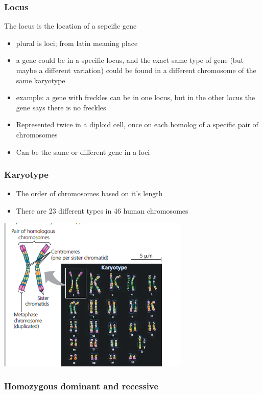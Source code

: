 \documentclass{article}
\begin{document}
\subsubsection*{Locus}
The locus is the location of a sepcific gene
\begin{itemize}
    \item plural is loci; from latin meaning place
    \item a gene could be in a specific locus, and the exact same type of gene (but maybe a different variation) could be found in a different chromosome of the same karyotype
    \item example: a gene with freckles can be in one locus, but in the other locus the gene says there is no freckles
    \item Represented twice in a diploid cell, once on each homolog of a specific pair of chromosomes
    \item Can be the same or different gene in a loci
\end{itemize}

\subsubsection*{Karyotype}
\begin{itemize}
    \item The order of chromosomes based on it's length
    \item There are 23 different types in 46 human chromosomes
\end{itemize}
\includegraphics*[scale=1.8]{karyotype.png}


\subsubsection*{Homozygous dominant and recessive}
\end{document}
